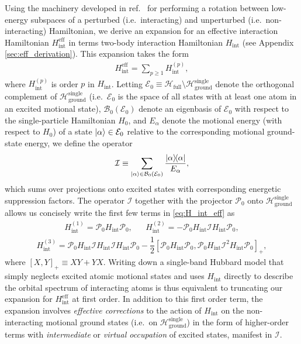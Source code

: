 \documentclass[preprint,showkeys,nofootinbib]{revtex4-1}
\renewcommand{\t}{\text} %
\newcommand{\f}{\dfrac} %
\newcommand{\p}[1]{\left(#1\right)} %
\renewcommand{\sp}[1]{\left[#1\right]} %
\newcommand{\B}{\mathcal{B}}
\newcommand{\E}{\mathcal{E}}
\renewcommand{\H}{\mathcal{H}}
\newcommand{\I}{\mathcal{I}}
\renewcommand{\P}{\mathcal{P}}
\newcommand{\1}{\mathds{1}}
\begin{document}
Using the machinery developed in ref.~\cite{bravyi2011schrieffer} for
performing a rotation between low-energy subspaces of a perturbed
(i.e.~interacting) and unperturbed (i.e.~non-interacting) Hamiltonian,
we derive an expansion for an effective interaction Hamiltonian
$H_{\t{int}}^{\t{eff}}$ in terms two-body interaction Hamiltonian
$H_{\t{int}}$ (see Appendix \ref{sec:eff_derivation}).  This expansion
takes the form
\begin{align}
  H_{\t{int}}^{\t{eff}} = \sum_{p\ge1} H_{\t{int}}^{(p)},
  \label{eq:H_int_eff}
\end{align}
where $H_{\t{int}}^{(p)}$ is order $p$ in $H_{\t{int}}$.  Letting
$\E_0\equiv \H_{\t{full}}\setminus\H_{\t{ground}}^{\t{single}}$ denote
the orthogonal complement of $\H_{\t{ground}}^{\t{single}}$
(i.e.~$\E_0$ is the space of all states with at least one atom in an
excited motional state), $\B_0\p{\E_0}$ denote an eigenbasis of $\E_0$
with respect to the single-particle Hamiltonian $H_0$, and $E_\alpha$
denote the motional energy (with respect to $H_0$) of a state
$\ket\alpha\in\E_0$ relative to the corresponding motional
ground-state energy, we define the operator
\begin{align}
  \I \equiv \sum_{\ket\alpha\in\B_0\p{\E_0}} \f{\op\alpha}{E_\alpha},
\end{align}
which sums over projections onto excited states with corresponding
energetic suppression factors.  The operator $\I$ together with the
projector $\P_0$ onto $\H_{\t{ground}}^{\t{single}}$ allows us
concisely write the first few terms in \eqref{eq:H_int_eff} as
\begin{align}
  H_{\t{int}}^{(1)} = \P_0 H_{\t{int}} \P_0,
  &&
  H_{\t{int}}^{(2)} = -\P_0 H_{\t{int}} \I H_{\t{int}} \P_0,
  \label{eq:H_int_1_2}
\end{align}
\begin{align}
  H_{\t{int}}^{(3)}
  = \P_0 H_{\t{int}} \I H_{\t{int}} \I H_{\t{int}} \P_0
  - \f12\sp{\P_0 H_{\t{int}} \P_0,
    \P_0 H_{\t{int}} \I^2 H_{\t{int}} \P_0}_+,
  \label{eq:H_int_3}
\end{align}
where $\sp{X,Y}_+\equiv XY+YX$.  Writing down a single-band Hubbard
model that simply neglects excited atomic motional states and uses
$H_{\t{int}}$ directly to describe the orbital spectrum of interacting
atoms is thus equivalent to truncating our expansion for
$H_{\t{int}}^{\t{eff}}$ at first order.  In addition to this first
order term, the expansion involves {\it effective corrections} to the
action of $H_{\t{int}}$ on the non-interacting motional ground states
(i.e.~on $\H_{\t{ground}}^{\t{single}}$) in the form of higher-order
terms with {\it intermediate} or {\it virtual occupation} of excited
states, manifest in $\I$.
\end{document}

